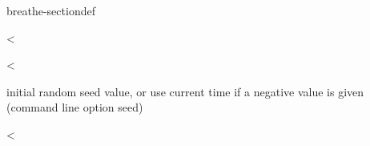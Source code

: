 \documentclass[letterpaper,10pt,openany,oneside,english]{sphinxmanual}
\begin{document}
\begin{fulllineitems}
\begin{sphinxuseclass}{breathe-sectiondef}
\begin{fulllineitems}
\end{fulllineitems}


\begin{fulllineitems}
\label{\detokenize{ref/ref_cpp:_CPPv4N8ToulBar24seedE}}\label{\detokenize{ref/ref_cpp:_CPPv3N8ToulBar24seedE}}\label{\detokenize{ref/ref_cpp:_CPPv2N8ToulBar24seedE}}\label{\detokenize{ref/ref_cpp:ToulBar2::seed__i}}
\pysigstartsignatures
\pysigstartmultiline
{}
\pysigstopmultiline
\pysigstopsignatures
\sphinxAtStartPar
\textless{} 

\end{fulllineitems}


\begin{fulllineitems}
\label{\detokenize{ref/ref_cpp:_CPPv4N8ToulBar29incop_cmdE}}\label{\detokenize{ref/ref_cpp:_CPPv3N8ToulBar29incop_cmdE}}\label{\detokenize{ref/ref_cpp:_CPPv2N8ToulBar29incop_cmdE}}\label{\detokenize{ref/ref_cpp:ToulBar2::incop_cmd__string}}
\pysigstartsignatures
\pysigstartmultiline
{}
\pysigstopmultiline
\pysigstopsignatures
\sphinxAtStartPar
\textless{} 

\sphinxAtStartPar
initial random seed value, or use current time if a negative value is given (command line option \sphinxhyphen{}seed) 

\end{fulllineitems}


\begin{fulllineitems}
\label{\detokenize{ref/ref_cpp:_CPPv4N8ToulBar28pils_cmdE}}\label{\detokenize{ref/ref_cpp:_CPPv3N8ToulBar28pils_cmdE}}\label{\detokenize{ref/ref_cpp:_CPPv2N8ToulBar28pils_cmdE}}\label{\detokenize{ref/ref_cpp:ToulBar2::pils_cmd__string}}
\pysigstartsignatures
\pysigstartmultiline
{}
\pysigstopmultiline
\pysigstopsignatures
\sphinxAtStartPar
\textless{} 


\end{fulllineitems}
\end{sphinxuseclass}
\end{fulllineitems}
\end{document}
